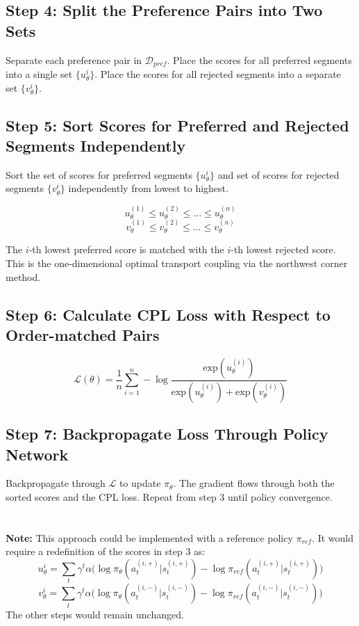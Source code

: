 \documentclass{article}
\begin{document}
\subsection*{Step 4: Split the Preference Pairs into Two Sets}
Separate each preference pair in $\mathcal{D}_{pref}$. Place the scores for all preferred segments into a single set $\{u_\theta^i\}$. Place the scores for all rejected segments into a separate set $\{v_\theta^i\}$.

\subsection*{Step 5: Sort Scores for Preferred and Rejected Segments Independently}
Sort the set of scores for preferred segments $\{u_\theta^i\}$ and set of scores for rejected segments $\{v_\theta^i\}$ independently from lowest to highest.

$$u_\theta^{(1)} \leq u_\theta^{(2)} \leq ...\leq u_\theta^{(n)}$$
$$v_\theta^{(1)} \leq v_\theta^{(2)} \leq ...\leq v_\theta^{(n)}$$

The $i$-th lowest preferred score is matched with the $i$-th lowest rejected score. This is the one-dimensional optimal transport coupling via the northwest corner method.

\subsection*{Step 6: Calculate CPL Loss with Respect to Order-matched Pairs}
$$\mathcal{L}(\theta)=\frac{1}{n}\sum_{i=1}^{n}-\log \frac{\text{exp}(u_\theta^{(i)})}{\text{exp}(u_\theta^{(i)})+\text{exp}(v_\theta^{(i)})}$$

\subsection*{Step 7: Backpropagate Loss Through Policy Network}
Backpropagate through $\mathcal{L}$ to update $\pi_\theta$. The gradient flows through both the sorted scores and the CPL loss. Repeat from step 3 until policy convergence.\\ \\ \\ \textbf{Note:} This approach could be implemented with a reference policy $\pi_{ref}$. It would require a redefinition of the scores in step 3 as:
$$u_\theta^i = \sum_{t}\gamma^t \alpha \big(\log \pi_\theta(a_t^{(i,+)}|s_t^{(i,+)}) - \log \pi_{ref}(a_t^{(i,+)}|s_t^{(i,+)})\big)$$
$$v_\theta^i = \sum_{t}\gamma^t \alpha \big(\log \pi_\theta(a_t^{(i,-)}|s_t^{(i,-)}) - \log \pi_{ref}(a_t^{(i,-)}|s_t^{(i,-)})\big)$$
The other steps would remain unchanged.
\newpage
\end{document}
